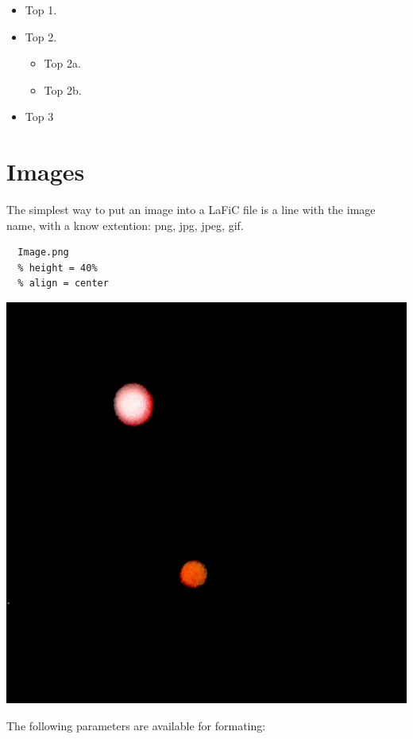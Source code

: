 \documentclass{article}
\begin{document}
\begin{itemize}
\item Top 1.
\item Top 2.
\begin{itemize}
\item Top 2a.
\item Top 2b.
\end{itemize}
\item Top 3
\end{itemize}


\section{Images}

{The simplest way to put an image into a LaFiC file is a
line with the image name, with a know extention: png, jpg,
jpeg, gif.\\}

\begin{verbatim}
  Image.png
  % height = 40%
  % align = center
\end{verbatim}


{\centering\includegraphics[height=.40\textheight]{Image.png}\\}

{The following parameters are available for formating:\\}
\end{document}
